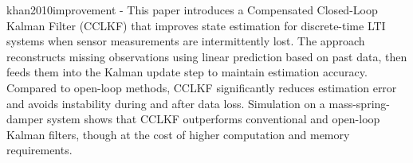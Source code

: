 khan2010improvement - This paper introduces a Compensated Closed-Loop Kalman Filter (CCLKF) that improves state estimation for discrete-time LTI systems when sensor measurements are intermittently lost. The approach reconstructs missing observations using linear prediction based on past data, then feeds them into the Kalman update step to maintain estimation accuracy. Compared to open-loop methods, CCLKF significantly reduces estimation error and avoids instability during and after data loss. Simulation on a mass-spring-damper system shows that CCLKF outperforms conventional and open-loop Kalman filters, though at the cost of higher computation and memory requirements.

% 
